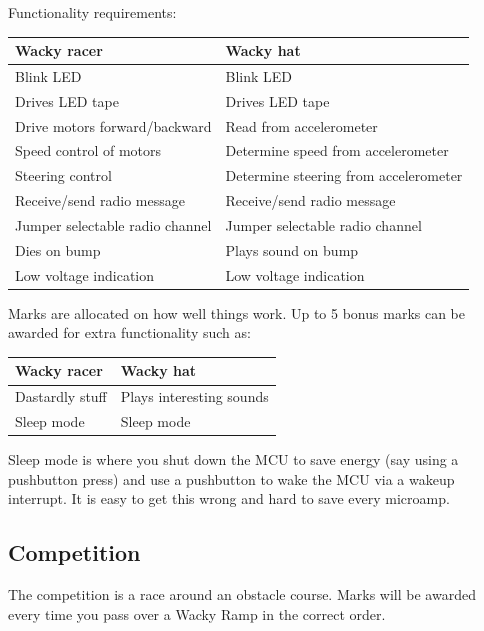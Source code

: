 \documentclass[11pt, a4paper]{article}
\begin{document}
Functionality requirements:
%
\begin{flushleft}
  \begin{tabular}{l|l}
    Wacky racer & Wacky hat \\ \hline \hline
    Blink LED                      & Blink LED \\
    Drives LED tape                & Drives LED tape \\
    Drive motors forward/backward  & Read from accelerometer \\
    Speed control of motors        & Determine speed from accelerometer \\
    Steering control               & Determine steering from accelerometer\\
    Receive/send radio message     & Receive/send radio message \\
    Jumper selectable radio channel & Jumper selectable radio channel  \\
    Dies on bump                   & Plays sound on bump \\
    Low voltage indication         & Low voltage indication \\
  \end{tabular}
\end{flushleft}
%
Marks are allocated on how well things work.  Up to 5 bonus marks can
be awarded for extra functionality such as:
%
\begin{flushleft}
  \begin{tabular}{l|l}
    Wacky racer                & Wacky hat \\ \hline \hline
    Dastardly stuff            & Plays interesting sounds \\
    Sleep mode                 & Sleep mode \\
  \end{tabular}
\end{flushleft}

Sleep mode is where you shut down the MCU to save energy (say using a
pushbutton press) and use a pushbutton to wake the MCU via a wakeup
interrupt.  It is easy to get this wrong and hard to save every
microamp.

\subsection{Competition}

The competition is a race around an obstacle course.  Marks will be
awarded every time you pass over a Wacky Ramp in the correct order.
\end{document}
